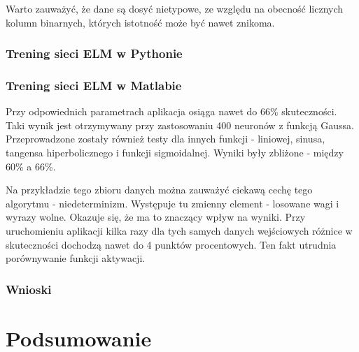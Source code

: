 \documentclass{article}
\begin{document}
Warto zauważyć, że dane są dosyć nietypowe, ze względu na obecność licznych kolumn binarnych, których istotność może być nawet znikoma.
\subsubsection{Trening sieci ELM w Pythonie}
\subsubsection{Trening sieci ELM w Matlabie}
Przy odpowiednich parametrach aplikacja osiąga nawet do 66\% skuteczności. 
Taki wynik jest otrzymywany przy zastosowaniu 400 neuronów z funkcją Gaussa.
Przeprowadzone zostały również testy dla innych funkcji - liniowej, sinusa, tangensa hiperbolicznego i funkcji sigmoidalnej.
Wyniki były zbliżone - między 60\% a 66\%.

Na przykładzie tego zbioru danych można zauważyć ciekawą cechę tego algorytmu - niedeterminizm.
Występuje tu zmienny element - losowane wagi i wyrazy wolne.
Okazuje się, że ma to znaczący wpływ na wyniki.
Przy uruchomieniu aplikacji kilka razy dla tych samych danych wejściowych różnice w skuteczności dochodzą nawet do 4 punktów procentowych.
Ten fakt utrudnia porównywanie funkcji aktywacji.

\subsubsection{Wnioski}
\clearpage
\section*{Podsumowanie}

\clearpage
{}
\end{document}
